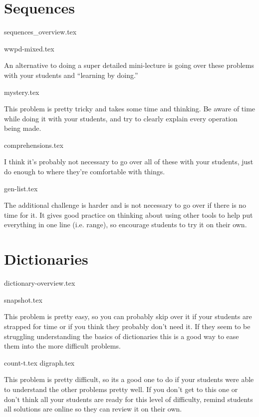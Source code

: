 \documentclass{exam}
\begin{document}
\section{Sequences}
{sequences_overview.tex}
\begin{questions}
    {wwpd-mixed.tex}
    \begin{questionmeta}
        An alternative to doing a super detailed mini-lecture is going over these problems with your students and ``learning by doing.'' 
    \end{questionmeta}
    {mystery.tex}
    \begin{questionmeta}
        This problem is pretty tricky and takes some time and thinking. Be aware of time while doing it with your students, and try to clearly explain every operation being made. 
    \end{questionmeta}
    {comprehensions.tex}
    \begin{questionmeta}
        I think it's probably not necessary to go over all of these with your students, just do enough to where they're comfortable with things. 
    \end{questionmeta}
    {gen-list.tex}
    \begin{questionmeta}
        The additional challenge is harder and is not necessary to go over if there is no time for it. It gives good practice on thinking about using other tools to help put everything in one line (i.e. range), so encourage students to try it on their own.
    \end{questionmeta}
\end{questions}

\section{Dictionaries}
{dictionary-overview.tex}
\begin{questions}
    {snapshot.tex}
    \begin{questionmeta}
        This problem is pretty easy, so you can probably skip over it if your students are strapped for time or if you think they probably don't need it. If they seem to be struggling understanding the basics of dictionaries this is a good way to ease them into the more difficult problems.
    \end{questionmeta}
    {count-t.tex}
    {digraph.tex}
    \begin{questionmeta}
        This problem is pretty difficult, so its a good one to do if your students were able to understand the other problems pretty well. If you don't get to this one or don't think all your students are ready for this level of difficulty, remind students all solutions are online so they can review it on their own.
    \end{questionmeta}
\end{questions}
\end{document}
